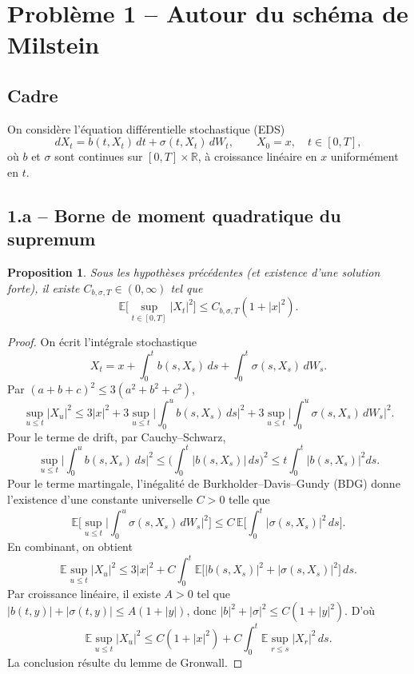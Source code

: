 \documentclass[11pt,a4paper]{article}
\newcommand{\E}{\mathbb{E}}
\newcommand{\R}{\mathbb{R}}
\newcommand{\1}{\mathbbm{1}}
\theoremstyle{plain}
\newtheorem{proposition}{Proposition}
\theoremstyle{definition}
\begin{document}
\section{Problème 1 -- Autour du schéma de Milstein}
\subsection{Cadre}
On considère l'équation différentielle stochastique (EDS)
\begin{equation}\label{eq:eds-general}
  dX_t=b(t,X_t)\,dt+\sigma(t,X_t)\,dW_t,\qquad X_0=x,\quad t\in[0,T],
\end{equation}
où $b$ et $\sigma$ sont continues sur $[0,T]\times\R$, à croissance linéaire en $x$ uniformément en $t$.

\subsection{1.a -- Borne de moment quadratique du supremum}
\begin{proposition}\label{prop:sup2}
Sous les hypothèses précédentes (et existence d'une solution forte), il existe $C_{b,\sigma,T}\in(0,\infty)$ tel que
\[
  \E\Big[\sup_{t\in[0,T]}|X_t|^2\Big]\le C_{b,\sigma,T}(1+|x|^2).
\]
\end{proposition}
\begin{proof}
On écrit l'intégrale stochastique
\[
X_t=x+\int_0^t b(s,X_s)\,ds+\int_0^t \sigma(s,X_s)\,dW_s.
\]
Par $(a+b+c)^2\le 3(a^2+b^2+c^2)$,
\[
\sup_{u\le t}|X_u|^2 \le 3|x|^2 + 3\sup_{u\le t}\Big|\int_0^u b(s,X_s)\,ds\Big|^2
 +3\sup_{u\le t}\Big|\int_0^u \sigma(s,X_s)\,dW_s\Big|^2.
\]
Pour le terme de drift, par Cauchy--Schwarz,
\[
\sup_{u\le t}\Big|\int_0^u b(s,X_s)\,ds\Big|^2
\le \Big(\int_0^t |b(s,X_s)|\,ds\Big)^2
\le t\int_0^t |b(s,X_s)|^2ds.
\]
Pour le terme martingale, l'inégalité de Burkholder--Davis--Gundy (BDG) donne l'existence d'une constante universelle $C>0$ telle que
\[
\E\Big[\sup_{u\le t}\Big|\int_0^u \sigma(s,X_s)\,dW_s\Big|^2\Big]
\le C\,\E\Big[\int_0^t |\sigma(s,X_s)|^2\,ds\Big].
\]
En combinant, on obtient
\[
\E\sup_{u\le t}|X_u|^2
\le 3|x|^2 + C\int_0^t \E\big[|b(s,X_s)|^2+|\sigma(s,X_s)|^2\big]\,ds.
\]
Par croissance linéaire, il existe $A>0$ tel que $|b(t,y)|+|\sigma(t,y)|\le A(1+|y|)$, donc
$|b|^2+|\sigma|^2\le C(1+|y|^2)$. D'où
\[
\E\sup_{u\le t}|X_u|^2
\le C(1+|x|^2)+C\int_0^t \E\sup_{r\le s}|X_r|^2\,ds.
\]
La conclusion résulte du lemme de Gronwall.
\end{proof}
\end{document}
